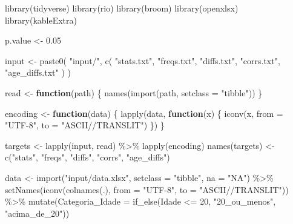 \documentclass[
]{article}
\newenvironment{Shaded}{\begin{snugshade}}{\end{snugshade}}
\newcommand{\AttributeTok}[1]{\textcolor[rgb]{0.77,0.63,0.00}{#1}}
\newcommand{\ControlFlowTok}[1]{\textcolor[rgb]{0.13,0.29,0.53}{\textbf{#1}}}
\newcommand{\DecValTok}[1]{\textcolor[rgb]{0.00,0.00,0.81}{#1}}
\newcommand{\FloatTok}[1]{\textcolor[rgb]{0.00,0.00,0.81}{#1}}
\newcommand{\FunctionTok}[1]{\textcolor[rgb]{0.00,0.00,0.00}{#1}}
\newcommand{\NormalTok}[1]{#1}
\newcommand{\OtherTok}[1]{\textcolor[rgb]{0.56,0.35,0.01}{#1}}
\newcommand{\SpecialCharTok}[1]{\textcolor[rgb]{0.00,0.00,0.00}{#1}}
\newcommand{\StringTok}[1]{\textcolor[rgb]{0.31,0.60,0.02}{#1}}
\begin{document}
\begin{Shaded}
\begin{Highlighting}[]
\FunctionTok{library}\NormalTok{(tidyverse)}
\FunctionTok{library}\NormalTok{(rio)}
\FunctionTok{library}\NormalTok{(broom)}
\FunctionTok{library}\NormalTok{(openxlsx)}
\FunctionTok{library}\NormalTok{(kableExtra)}

\NormalTok{p.value }\OtherTok{\textless{}{-}} \FloatTok{0.05}

\NormalTok{input }\OtherTok{\textless{}{-}} \FunctionTok{paste0}\NormalTok{(}
    \StringTok{"input/"}\NormalTok{,}
    \FunctionTok{c}\NormalTok{(}
        \StringTok{"stats.txt"}\NormalTok{,}
        \StringTok{"freqs.txt"}\NormalTok{,}
        \StringTok{"diffs.txt"}\NormalTok{,}
        \StringTok{"corrs.txt"}\NormalTok{,}
        \StringTok{"age\_diffs.txt"}
\NormalTok{    )}
\NormalTok{)}

\NormalTok{read }\OtherTok{\textless{}{-}} \ControlFlowTok{function}\NormalTok{(path) \{}
    \FunctionTok{names}\NormalTok{(}\FunctionTok{import}\NormalTok{(path, }\AttributeTok{setclass =} \StringTok{"tibble"}\NormalTok{))}
\NormalTok{\}}

\NormalTok{encoding }\OtherTok{\textless{}{-}} \ControlFlowTok{function}\NormalTok{(data) \{}
    \FunctionTok{lapply}\NormalTok{(data, }\ControlFlowTok{function}\NormalTok{(x) \{}
        \FunctionTok{iconv}\NormalTok{(x, }\AttributeTok{from =} \StringTok{"UTF{-}8"}\NormalTok{, }\AttributeTok{to =} \StringTok{"ASCII//TRANSLIT"}\NormalTok{)}
\NormalTok{    \})}
\NormalTok{\}}

\NormalTok{targets }\OtherTok{\textless{}{-}} \FunctionTok{lapply}\NormalTok{(input, read) }\SpecialCharTok{\%\textgreater{}\%} \FunctionTok{lapply}\NormalTok{(encoding)}
\FunctionTok{names}\NormalTok{(targets) }\OtherTok{\textless{}{-}} \FunctionTok{c}\NormalTok{(}\StringTok{"stats"}\NormalTok{, }\StringTok{"freqs"}\NormalTok{, }\StringTok{"diffs"}\NormalTok{, }\StringTok{"corrs"}\NormalTok{, }\StringTok{"age\_diffs"}\NormalTok{)}

\NormalTok{data }\OtherTok{\textless{}{-}} \FunctionTok{import}\NormalTok{(}\StringTok{"input/data.xlsx"}\NormalTok{, }\AttributeTok{setclass =} \StringTok{"tibble"}\NormalTok{, }\AttributeTok{na =} \StringTok{"NA"}\NormalTok{) }\SpecialCharTok{\%\textgreater{}\%}
    \FunctionTok{setNames}\NormalTok{(}\FunctionTok{iconv}\NormalTok{(}\FunctionTok{colnames}\NormalTok{(.), }\AttributeTok{from =} \StringTok{"UTF{-}8"}\NormalTok{, }\AttributeTok{to =} \StringTok{"ASCII//TRANSLIT"}\NormalTok{)) }\SpecialCharTok{\%\textgreater{}\%}
    \FunctionTok{mutate}\NormalTok{(}\AttributeTok{Categoria\_Idade =} \FunctionTok{if\_else}\NormalTok{(Idade }\SpecialCharTok{\textless{}=} \DecValTok{20}\NormalTok{, }\StringTok{"20\_ou\_menos"}\NormalTok{, }\StringTok{"acima\_de\_20"}\NormalTok{))}
\end{Highlighting}
\end{Shaded}
\end{document}
